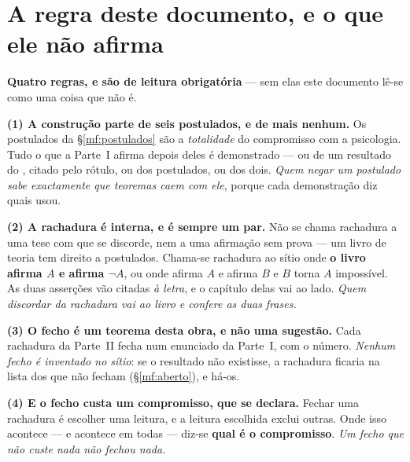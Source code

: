 \documentclass[../livro.tex]{subfiles}
\begin{document}
\section{A regra deste documento, e o que ele não afirma}\label{mf:regra}

\noindent\textbf{Quatro regras, e são de leitura obrigatória} --- sem elas este
documento lê-se como uma coisa que não é.

\medskip\noindent\textbf{(1) A construção parte de seis postulados, e de mais
nenhum.} Os postulados da §\ref{mf:postulados} são a \emph{totalidade} do
compromisso com a psicologia. Tudo o que a Parte~I afirma depois deles é
demonstrado --- ou de um resultado do , citado pelo rótulo, ou
dos postulados, ou dos dois. \emph{Quem negar um postulado sabe exactamente que
teoremas caem com ele}, porque cada demonstração diz quais usou.

\medskip\noindent\textbf{(2) A rachadura é interna, e é sempre um par.} Não se
chama rachadura a uma tese com que se discorde, nem a uma afirmação sem prova ---
um livro de teoria tem direito a postulados. Chama-se rachadura ao sítio onde
\textbf{o livro afirma $A$ e afirma $\neg A$}, ou onde afirma $A$ e afirma $B$ e
$B$ torna $A$ impossível. As duas asserções vão citadas \emph{à letra}, e o
capítulo delas vai ao lado. \emph{Quem discordar da rachadura vai ao livro e
confere as duas frases.}

\medskip\noindent\textbf{(3) O fecho é um teorema desta obra, e não uma
sugestão.} Cada rachadura da Parte~II fecha num enunciado da Parte~I, com o
número. \emph{Nenhum fecho é inventado no sítio}: se o resultado não existisse, a
rachadura ficaria na lista dos que não fecham (§\ref{mf:aberto}), e há-os.

\medskip\noindent\textbf{(4) E o fecho custa um compromisso, que se declara.}
Fechar uma rachadura é escolher uma leitura, e a leitura escolhida exclui outras.
Onde isso acontece --- e acontece em todas --- diz-se \textbf{qual é o
compromisso}. \emph{Um fecho que não custe nada não fechou nada.}

\medskip
{}
\end{document}
